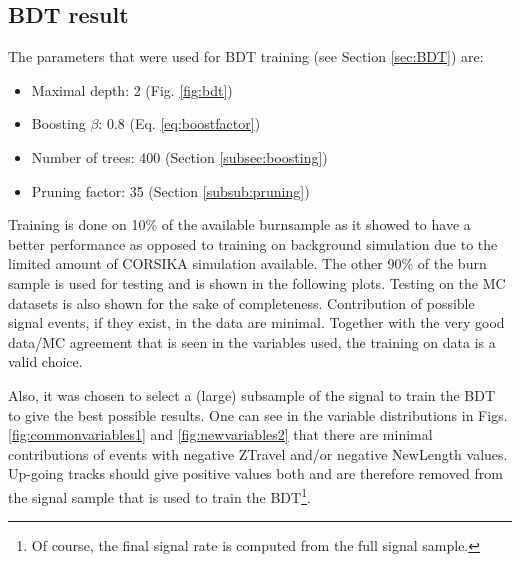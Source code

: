 \subsection{BDT result}
The parameters that were used for BDT training (see Section \ref{sec:BDT}) are:
\vspace{2mm}
\begin{itemize}
\item Maximal depth: 2 (Fig. \ref{fig:bdt})
\item Boosting $\beta$: 0.8 (Eq. \ref{eq:boostfactor})
\item Number of trees: 400 (Section \ref{subsec:boosting})
\item Pruning factor: 35 (Section \ref{subsub:pruning})
\end{itemize}
\vspace{2mm}
\noindent Training is done on 10\% of the available burnsample as it showed to have a better performance as opposed to training on background simulation due to the limited amount of CORSIKA simulation available. The other 90\% of the burn sample is used for testing and is shown in the following plots. Testing on the MC datasets is also shown for the sake of completeness. Contribution of possible signal events, if they exist, in the data are minimal. Together with the very good data/MC agreement that is seen in the variables used, the training on data is a valid choice.

Also, it was chosen to select a (large) subsample of the signal to train the BDT to give the best possible results. One can see in the variable distributions in Figs. \ref{fig:commonvariables1} and \ref{fig:newvariables2} that there are minimal contributions of events with negative ZTravel and/or negative NewLength values. Up-going tracks should give positive values both and are therefore removed from the signal sample that is used to train the BDT\footnote{Of course, the final signal rate is computed from the full signal sample.}.\\

